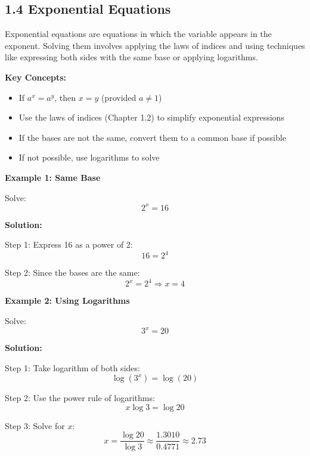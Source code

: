 
\subsection*{1.4 Exponential Equations}

Exponential equations are equations in which the variable appears in the exponent. Solving them involves applying the laws of indices and using techniques like expressing both sides with the same base or applying logarithms.

\textbf{Key Concepts:}
\begin{itemize}
    \item If \( a^x = a^y \), then \( x = y \) (provided \( a \neq 1 \))
    \item Use the laws of indices (Chapter 1.2) to simplify exponential expressions
    \item If the bases are not the same, convert them to a common base if possible
    \item If not possible, use logarithms to solve
\end{itemize}

\begin{flushleft}
\textbf{Example 1: Same Base}

Solve:  
\[
2^x = 16
\]

\textbf{Solution:} \vspace{0.2cm}

Step 1: Express 16 as a power of 2:  
\[
16 = 2^4
\]

Step 2: Since the bases are the same:  
\[
2^x = 2^4 \Rightarrow x = 4
\]
\end{flushleft}

\begin{flushleft}
\textbf{Example 2: Using Logarithms}

Solve:  
\[
3^x = 20
\]

\textbf{Solution:} \vspace{0.2cm}

Step 1: Take logarithm of both sides:  
\[
\log(3^x) = \log(20)
\]

Step 2: Use the power rule of logarithms:  
\[
x \log 3 = \log 20
\]

Step 3: Solve for \(x\):  
\[
x = \frac{\log 20}{\log 3} \approx \frac{1.3010}{0.4771} \approx 2.73
\]
\end{flushleft}
